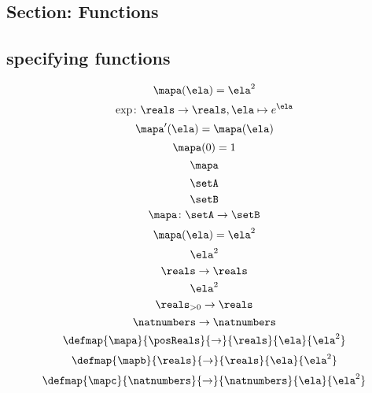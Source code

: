 \begin{forslides}
\subsection{Section: Functions}

\subsection{specifying functions}


\begin{equation}\label{eq:slides_session2_76}
\mapa(\ela)=\ela^2
\end{equation}
\begin{equation}\label{eq:slides_session2_77}
\exp \colon \reals \to \reals, \ela \mapsto e^\ela
\end{equation}
\begin{equation}\label{eq:slides_session2_78}
\mapa'(\ela) = \mapa(\ela)
\end{equation}
\begin{equation}\label{eq:slides_session2_79}
\mapa(0) =1
\end{equation}
\begin{equation}\label{eq:slides_session2_80}
\mapa
\end{equation}
\begin{equation}\label{eq:slides_session2_81}
\setA
\end{equation}
\begin{equation}\label{eq:slides_session2_82}
\setB
\end{equation}
\begin{equation}\label{eq:slides_session2_83}
\mapa\colon \setA \to \setB
\end{equation}
\begin{equation}\label{eq:slides_session2_84}
\mapa(\ela)=\ela^2
\end{equation}
\begin{equation}\label{eq:slides_session2_85}
\ela^2
\end{equation}
\begin{equation}\label{eq:slides_session2_86}
\reals \to \reals
\end{equation}
\begin{equation}\label{eq:slides_session2_87}
\ela^2
\end{equation}
\begin{equation}\label{eq:slides_session2_88}
\reals_{> 0} \to \reals
\end{equation}
\begin{equation}\label{eq:slides_session2_89}
\natnumbers \to \natnumbers
\end{equation}
\begin{equation}\label{eq:slides_session2_90}
\defmap{\mapa}{\posReals}{\to}{\reals}{\ela}{\ela^2}
\end{equation}
\begin{equation}\label{eq:slides_session2_91}
\defmap{\mapb}{\reals}{\to}{\reals}{\ela}{\ela^2}
\end{equation}
\begin{equation}\label{eq:slides_session2_92}
\defmap{\mapc}{\natnumbers}{\to}{\natnumbers}{\ela}{\ela^2}
\end{equation}


\end{forslides}
